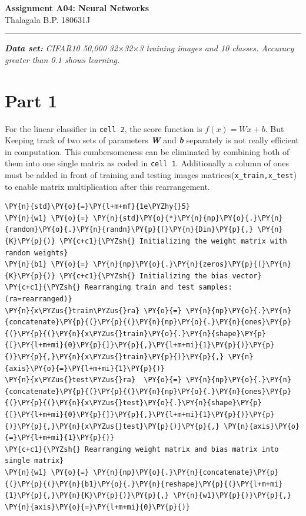 \documentclass[a4paper,11pt]{article}%
\begin{document}
	\begin{center}
	{\large \textbf{Assignment A04: Neural Networks}}\\
	Thalagala B.P.\hspace{0.5cm} 180631J 
\end{center}
\hrule


\hspace{10mm}


\textit{\textbf{Data set:} CIFAR10 50,000 32$\times$32$\times$3 training images and 10 classes. Accuracy greater than 0.1 shows learning.}
\section*{Part 1}

For the linear classifier in {\tt cell 2}, the score function is $f(x) = Wx +b$. But Keeping track of two sets of parameters \textbf{\textit{W}} and \textit{\textbf{b}} separately is not really efficient in computation. This cumbersomeness can be eliminated by combining both of them into one single matrix as coded in {\tt cell 1}. Additionally a column of ones must be added in front of training and testing images matrices({\tt x\_train,x\_test}) to enable matrix multiplication after this rearrangement.\\

    \begin{tcolorbox}[breakable, size=fbox, boxrule=1pt, pad at break*=1mm,colback=cellbackground, colframe=cellborder]
\begin{Verbatim}[commandchars=\\\{\}]
\PY{n}{std}\PY{o}{=}\PY{l+m+mf}{1e\PYZhy{}5} 
\PY{n}{w1} \PY{o}{=} \PY{n}{std}\PY{o}{*}\PY{n}{np}\PY{o}{.}\PY{n}{random}\PY{o}{.}\PY{n}{randn}\PY{p}{(}\PY{n}{Din}\PY{p}{,} \PY{n}{K}\PY{p}{)} \PY{c+c1}{\PYZsh{} Initializing the weight matrix with random weights}
\PY{n}{b1} \PY{o}{=} \PY{n}{np}\PY{o}{.}\PY{n}{zeros}\PY{p}{(}\PY{n}{K}\PY{p}{)} \PY{c+c1}{\PYZsh{} Initializing the bias vector}
\PY{c+c1}{\PYZsh{} Rearranging train and test samples: (ra=rearranged)}
\PY{n}{x\PYZus{}train\PYZus{}ra} \PY{o}{=} \PY{n}{np}\PY{o}{.}\PY{n}{concatenate}\PY{p}{(}\PY{p}{(}\PY{n}{np}\PY{o}{.}\PY{n}{ones}\PY{p}{(}\PY{p}{(}\PY{n}{x\PYZus{}train}\PY{o}{.}\PY{n}{shape}\PY{p}{[}\PY{l+m+mi}{0}\PY{p}{]}\PY{p}{,}\PY{l+m+mi}{1}\PY{p}{)}\PY{p}{)}\PY{p}{,}\PY{n}{x\PYZus{}train}\PY{p}{)}\PY{p}{,} \PY{n}{axis}\PY{o}{=}\PY{l+m+mi}{1}\PY{p}{)}
\PY{n}{x\PYZus{}test\PYZus{}ra}  \PY{o}{=} \PY{n}{np}\PY{o}{.}\PY{n}{concatenate}\PY{p}{(}\PY{p}{(}\PY{n}{np}\PY{o}{.}\PY{n}{ones}\PY{p}{(}\PY{p}{(}\PY{n}{x\PYZus{}test}\PY{o}{.}\PY{n}{shape}\PY{p}{[}\PY{l+m+mi}{0}\PY{p}{]}\PY{p}{,}\PY{l+m+mi}{1}\PY{p}{)}\PY{p}{)}\PY{p}{,}\PY{n}{x\PYZus{}test}\PY{p}{)}\PY{p}{,} \PY{n}{axis}\PY{o}{=}\PY{l+m+mi}{1}\PY{p}{)}
\PY{c+c1}{\PYZsh{} Rearranging weight matrix and bias matrix into single matrix}
\PY{n}{w1} \PY{o}{=} \PY{n}{np}\PY{o}{.}\PY{n}{concatenate}\PY{p}{(}\PY{p}{(}\PY{n}{b1}\PY{o}{.}\PY{n}{reshape}\PY{p}{(}\PY{l+m+mi}{1}\PY{p}{,}\PY{n}{K}\PY{p}{)}\PY{p}{,} \PY{n}{w1}\PY{p}{)}\PY{p}{,} \PY{n}{axis}\PY{o}{=}\PY{l+m+mi}{0}\PY{p}{)}
\end{Verbatim}
\end{tcolorbox}
\end{document}
